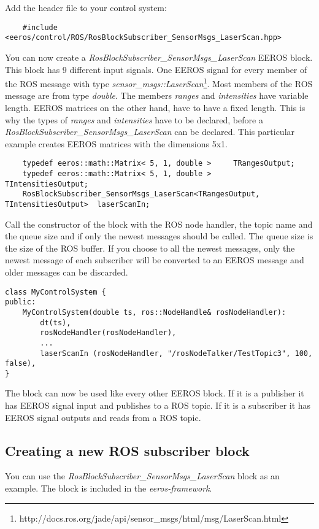 Add the header file to your control system:
\lstset{language=c}
\begin{lstlisting}
	#include <eeros/control/ROS/RosBlockSubscriber_SensorMsgs_LaserScan.hpp>
\end{lstlisting}

You can now create a \textit{RosBlockSubscriber\_SensorMsgs\_LaserScan} EEROS block.
This block has 9 different input signals.
One EEROS signal for every member of the ROS message with type \textit{sensor\_msgs::LaserScan}\footnote{http://docs.ros.org/jade/api/sensor\_msgs/html/msg/LaserScan.html}. 
Most members of the ROS message are from type \textit{double}.
The members \textit{ranges} and \textit{intensities} have variable length.
EEROS matrices on the other hand, have to have a fixed length.
This is why the types of \textit{ranges} and \textit{intensities} have to be declared, before a \textit{RosBlockSubscriber\_SensorMsgs\_LaserScan} can be declared.
This particular example creates EEROS matrices with the dimensions 5x1.
\lstset{language=c}
\begin{lstlisting}
	typedef eeros::math::Matrix< 5, 1, double >		TRangesOutput;
	typedef eeros::math::Matrix< 5, 1, double >		TIntensitiesOutput;
	RosBlockSubscriber_SensorMsgs_LaserScan<TRangesOutput, TIntensitiesOutput>	laserScanIn;
\end{lstlisting}

Call the constructor of the block with the ROS node handler, the topic name and the queue size and if only the newest messages should be called.
The queue size is the size of the ROS buffer.
If you choose to all the newest messages, only the newest message of each subscriber will be converted to an EEROS message and older messages can be discarded.
\lstset{language=c}
\begin{lstlisting}
class MyControlSystem {
public:
	MyControlSystem(double ts, ros::NodeHandle& rosNodeHandler):
		dt(ts),
		rosNodeHandler(rosNodeHandler),
		...
		laserScanIn (rosNodeHandler, "/rosNodeTalker/TestTopic3", 100, false),
}
\end{lstlisting}

The block can now be used like every other EEROS block.
If it is a publisher it has EEROS signal input and publishes to a ROS topic.
If it is a subscriber it has EEROS signal outputs and reads from a ROS topic.


\subsection{Creating a new ROS subscriber block}
\label{createRosBlock}
You can use the \textit{RosBlockSubscriber\_SensorMsgs\_LaserScan} block as an example.
The block is included in the \textit{eeros-framework}.


